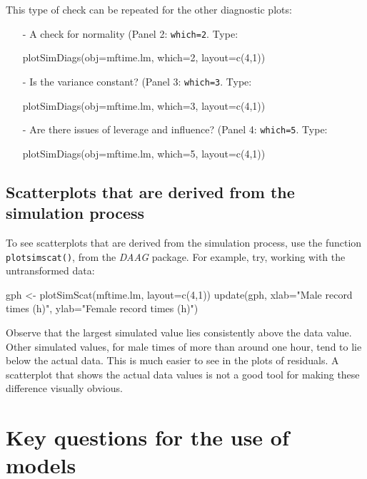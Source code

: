 \documentclass{tufte-book}\usepackage[]{graphicx}\usepackage[]{color}
\newcommand{\txtt}[1]{\texttt{#1}}
\begin{document}
This type of check can be repeated for the other diagnostic plots:
\begin{itemize}
  \item [-] A check for normality (Panel 2: \txtt{which=2}.  Type:
\begin{Schunk}
\begin{Sinput}
plotSimDiags(obj=mftime.lm, which=2, layout=c(4,1))
\end{Sinput}
\end{Schunk}
\item[-] Is the variance constant? (Panel 3: \txtt{which=3}.  Type:
\begin{Schunk}
\begin{Sinput}
plotSimDiags(obj=mftime.lm, which=3, layout=c(4,1))
\end{Sinput}
\end{Schunk}
\item[-]  Are there issues of leverage and influence? (Panel 4:
  \txtt{which=5}.  Type:
\begin{Schunk}
\begin{Sinput}
plotSimDiags(obj=mftime.lm, which=5, layout=c(4,1))
\end{Sinput}
\end{Schunk}
\end{itemize}

\subsection*{Scatterplots that are derived from the simulation process}

To see scatterplots that are derived from the simulation process,
use the function \txtt{plotsimscat()}, from the {\em DAAG} package.
For example, try, working with the untransformed data:
\begin{Schunk}
\begin{Sinput}
gph <- plotSimScat(mftime.lm, layout=c(4,1))
update(gph, xlab="Male record times (h)",
       ylab="Female record times (h)")
\end{Sinput}
\end{Schunk}
Observe that the largest simulated value lies consistently above the
data value. Other simulated values, for male times of more than around
one hour, tend to lie below the actual data.  This is much easier to
see in the plots of residuals.  A scatterplot that shows the actual
data values is not a good tool for making these difference
visually obvious.

 \section{Key questions for the use of models}
\end{document}
